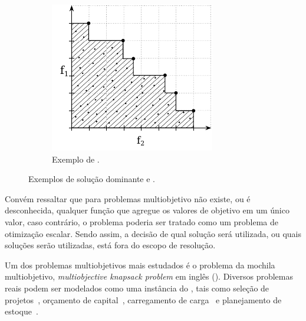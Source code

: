 \begin{figure}[h]
\begin{subfigure}[t]{0.3\textwidth}
        \includegraphics[width=\textwidth]{img/mokp/pareto-def}
        \caption{Exemplo de \paretoset{}.}
        \label{fig:eff-def}
    \end{subfigure}
    \caption{Exemplos de solução dominante e \paretoset{}.}
    \label{fig:mo-defs}
\end{figure}

Convém ressaltar que para problemas multiobjetivo não existe, ou é desconhecida,
qualquer função que agregue os valores de objetivo em um único valor,
caso contrário, o problema poderia ser tratado como um problema de
otimização escalar.
Sendo assim, a decisão de qual solução será utilizada,
ou quais soluções serão utilizadas, está fora do escopo de resolução.

Um dos problemas multiobjetivos mais estudados
é o problema da mochila multiobjetivo, \emph{multiobjective knapsack problem} em inglês (\mokp{}).
Diversos problemas reais podem ser modelados como uma instância do \mokp{}, tais
como seleção de projetos~\cite{teng1996multiobjective},
orçamento de capital~\cite{rosenblatt1989generating},
carregamento de carga~\cite{teng1996multiobjective}
e planejamento de estoque~\cite{ishibuchi2015behavior}.

